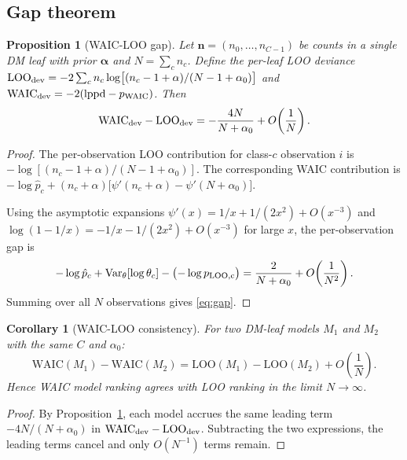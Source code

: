 \documentclass[ba]{imsart}
\theoremstyle{plain}
\newtheorem{proposition}[theorem]{Proposition}
\newtheorem{corollary}[theorem]{Corollary}
\theoremstyle{definition}
\theoremstyle{remark}
\newcommand{\bfn}{\boldsymbol{n}}
\newcommand{\bfal}{\boldsymbol{\alpha}}
\newcommand{\waic}{\mathrm{WAIC}}
\newcommand{\loo}{\mathrm{LOO}}
\newcommand{\lppd}{\mathrm{lppd}}
\begin{document}
\subsection{Gap theorem}

\begin{proposition}[WAIC-LOO gap]\label{prop:gap}
  Let $\bfn = (n_0,\ldots,n_{C-1})$ be counts in a single DM leaf with
  prior $\bfal$ and $N = \sum_c n_c$.
  Define the per-leaf LOO deviance
  $\loo_{\rm dev} = -2\sum_c n_c \log\bigl[(n_c-1+\alpha)/(N-1+\alpha_0)\bigr]$
  and $\waic_{\rm dev} = -2(\lppd - p_{\waic})$.
  Then
  \begin{equation}
    \waic_{\rm dev} - \loo_{\rm dev}
    = -\frac{4N}{N+\alpha_0} + O\!\left(\frac{1}{N}\right).
    \label{eq:gap}
  \end{equation}
\end{proposition}

\begin{proof}
The per-observation LOO contribution for class-$c$ observation $i$ is
$-\log[(n_c - 1 + \alpha)/(N-1+\alpha_0)]$.
The corresponding WAIC contribution is
$-\log\hat{p}_c + (n_c + \alpha)\bigl[\psi'(n_c+\alpha) - \psi'(N+\alpha_0)\bigr]$.

Using the asymptotic expansions $\psi'(x) = 1/x + 1/(2x^2) + O(x^{-3})$
and $\log(1-1/x) = -1/x - 1/(2x^2) + O(x^{-3})$ for large $x$, the
per-observation gap is
\begin{equation*}
  -\log\hat{p}_c + \operatorname{Var}_\theta[\log\theta_c]
  - \bigl(-\log p_{\rm LOO,c}\bigr)
  = \frac{2}{N+\alpha_0} + O\!\left(\frac{1}{N^2}\right).
\end{equation*}
Summing over all $N$ observations gives \eqref{eq:gap}.
\end{proof}

\begin{corollary}[WAIC-LOO consistency]\label{cor:consistency}
  For two DM-leaf models $M_1$ and $M_2$ with the same $C$ and $\alpha_0$:
  \begin{equation}
    \waic(M_1) - \waic(M_2) = \loo(M_1) - \loo(M_2) + O\!\left(\frac{1}{N}\right).
    \label{eq:consistency}
  \end{equation}
  Hence WAIC model ranking agrees with LOO ranking in the limit $N\to\infty$.
\end{corollary}

\begin{proof}
By Proposition~\ref{prop:gap}, each model accrues the same leading term
$-4N/(N+\alpha_0)$ in $\waic_{\rm dev} - \loo_{\rm dev}$.
Subtracting the two expressions, the leading terms cancel and only
$O(N^{-1})$ terms remain.
\end{proof}
\end{document}
